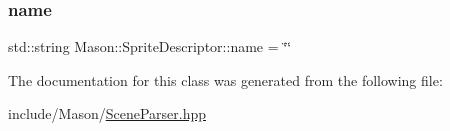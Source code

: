 \hypertarget{class_mason_1_1_sprite_descriptor_a78875744bb1e7ba41d6a35ccf83ba43c}{}\label{class_mason_1_1_sprite_descriptor_a78875744bb1e7ba41d6a35ccf83ba43c} 
\subsubsection{\texorpdfstring{name}{name}}
{\footnotesize\ttfamily std\+::string Mason\+::\+Sprite\+Descriptor\+::name = \char`\"{}\char`\"{}}



The documentation for this class was generated from the following file\+:\begin{DoxyCompactItemize}
\item 
include/\+Mason/\hyperlink{_scene_parser_8hpp}{Scene\+Parser.\+hpp}\end{DoxyCompactItemize}
